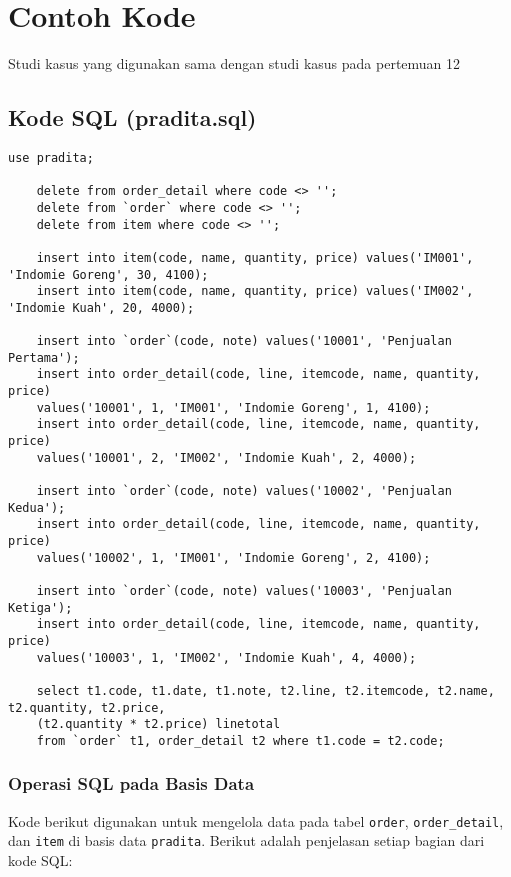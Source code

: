 \section{Contoh Kode}

Studi kasus yang digunakan sama dengan studi kasus pada pertemuan 12

\subsection{Kode SQL (pradita.sql)}

\begin{lstlisting}[style=sql]
	use pradita;
	
	delete from order_detail where code <> '';
	delete from `order` where code <> '';
	delete from item where code <> '';
	
	insert into item(code, name, quantity, price) values('IM001', 'Indomie Goreng', 30, 4100);
	insert into item(code, name, quantity, price) values('IM002', 'Indomie Kuah', 20, 4000);
	
	insert into `order`(code, note) values('10001', 'Penjualan Pertama');
	insert into order_detail(code, line, itemcode, name, quantity, price) 
	values('10001', 1, 'IM001', 'Indomie Goreng', 1, 4100);
	insert into order_detail(code, line, itemcode, name, quantity, price) 
	values('10001', 2, 'IM002', 'Indomie Kuah', 2, 4000);
	
	insert into `order`(code, note) values('10002', 'Penjualan Kedua');
	insert into order_detail(code, line, itemcode, name, quantity, price) 
	values('10002', 1, 'IM001', 'Indomie Goreng', 2, 4100);
	
	insert into `order`(code, note) values('10003', 'Penjualan Ketiga');
	insert into order_detail(code, line, itemcode, name, quantity, price) 
	values('10003', 1, 'IM002', 'Indomie Kuah', 4, 4000);
	
	select t1.code, t1.date, t1.note, t2.line, t2.itemcode, t2.name, t2.quantity, t2.price, 
	(t2.quantity * t2.price) linetotal
	from `order` t1, order_detail t2 where t1.code = t2.code;
\end{lstlisting}

\subsubsection{Operasi SQL pada Basis Data}

Kode berikut digunakan untuk mengelola data pada tabel \texttt{order}, \texttt{order\_detail}, dan \texttt{item} di basis data \texttt{pradita}. Berikut adalah penjelasan setiap bagian dari kode SQL:

